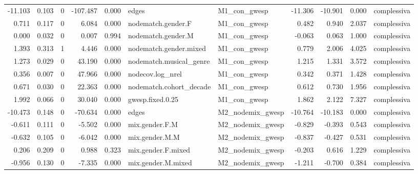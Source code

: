 \begin{table}
\begin{tabular}{rrrrrllrrrl}
  -11.103 & 0.103 &        0 & -107.487 &     0.000 &                   edges &     M1\_con\_gwesp & -11.306 & -10.901 &   0.000 &                 complessiva \\
    0.711 & 0.117 &        0 &    6.084 &     0.000 &      nodematch.gender.F &     M1\_con\_gwesp &   0.482 &   0.940 &   2.037 &                 complessiva \\
    0.000 & 0.032 &        0 &    0.007 &     0.994 &      nodematch.gender.M &     M1\_con\_gwesp &  -0.063 &   0.063 &   1.000 &                 complessiva \\
    1.393 & 0.313 &        1 &    4.446 &     0.000 &  nodematch.gender.mixed &     M1\_con\_gwesp &   0.779 &   2.006 &   4.025 &                 complessiva \\
    1.273 & 0.029 &        0 &   43.190 &     0.000 & nodematch.musical\_genre &     M1\_con\_gwesp &   1.215 &   1.331 &   3.572 &                 complessiva \\
    0.356 & 0.007 &        0 &   47.966 &     0.000 &        nodecov.log\_nrel &     M1\_con\_gwesp &   0.342 &   0.371 &   1.428 &                 complessiva \\
    0.671 & 0.030 &        0 &   22.363 &     0.000 & nodematch.cohort\_decade &     M1\_con\_gwesp &   0.612 &   0.730 &   1.956 &                 complessiva \\
    1.992 & 0.066 &        0 &   30.040 &     0.000 &        gwesp.fixed.0.25 &     M1\_con\_gwesp &   1.862 &   2.122 &   7.327 &                 complessiva \\
  -10.473 & 0.148 &        0 &  -70.634 &     0.000 &                   edges & M2\_nodemix\_gwesp & -10.764 & -10.183 &   0.000 &                 complessiva \\
   -0.611 & 0.111 &        0 &   -5.502 &     0.000 &          mix.gender.F.M & M2\_nodemix\_gwesp &  -0.829 &  -0.393 &   0.543 &                 complessiva \\
   -0.632 & 0.105 &        0 &   -6.042 &     0.000 &          mix.gender.M.M & M2\_nodemix\_gwesp &  -0.837 &  -0.427 &   0.531 &                 complessiva \\
    0.206 & 0.209 &        0 &    0.988 &     0.323 &      mix.gender.F.mixed & M2\_nodemix\_gwesp &  -0.203 &   0.616 &   1.229 &                 complessiva \\
   -0.956 & 0.130 &        0 &   -7.335 &     0.000 &      mix.gender.M.mixed & M2\_nodemix\_gwesp &  -1.211 &  -0.700 &   0.384 &                 complessiva \\

\end{tabular}
\end{table}
